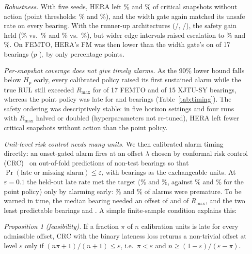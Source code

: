\documentclass[conference]{IEEEtran}
\newcommand{\Hp}{H_{\mathrm{p}}}
\begin{document}
\textit{Robustness.} With five seeds, HERA left \feRobFiveUnsafeHera\% and \xjRobFiveUnsafeHera\% of critical snapshots without action (point thresholds: \feRobFiveUnsafePoint\% and \xjRobFiveUnsafePoint\%), and the width gate again matched its unsafe rate on every bearing. With the runner-up architectures (\feRobAltEdge/\feRobAltCloud, \xjRobAltEdge/\xjRobAltCloud), the safety gain held (\feRobAltUnsafeHera\% vs.\ \feRobAltUnsafePoint\% and \xjRobAltUnsafeHera\% vs.\ \xjRobAltUnsafePoint\%), but wider edge intervals raised escalation to \feRobAltEscHera\% and \xjRobAltEscHera\%. On FEMTO, HERA's FM was then lower than the width gate's on \feRobAltNzFmWidth{} of 17 bearings ($p$ \feRobAltPFmWidth), by only \feRobAltFmWidthDiff{} percentage points.



\textit{Per-snapshot coverage does not give timely alarms.} As the 90\% lower bound falls below $\Hp$ early, every calibrated policy raised its first sustained alarm while the true RUL still exceeded $R_{\max}$ for \fePremHera{} of 17 FEMTO and \xjPremHera{} of 15 XJTU-SY bearings, whereas the point policy was late for \feLatePoint{} and \xjLatePoint{} bearings (Table~\ref{tab:timing}). The safety ordering was descriptively stable: in five horizon settings and four runs with $R_{\max}$ halved or doubled (hyperparameters not re-tuned), HERA left fewer critical snapshots without action than the point policy.

\textit{Unit-level risk control needs many units.} We then calibrated alarm timing directly: an onset-gated alarm fires at an offset $\lambda$ chosen by conformal risk control (CRC)~\cite{angelopoulos2024crc} on out-of-fold predictions of non-test bearings so that $\Pr(\text{late or missing alarm})\le\varepsilon$, with bearings as the exchangeable units. At $\varepsilon{=}0.1$ the held-out late rate met the target (\feLateCrcTen\% and \xjLateCrcTen\%, against \feLatePointHp\% and \xjLatePointHp\% for the point policy) only by alarming early: \fePremCrcTen\% and \xjPremCrcTen\% of alarms were premature. To be warned in time, the median bearing needed an offset of \feReqOffMed{} and \xjReqOffMed{} of $R_{\max}$, and the two least predictable bearings \feReqOffTop{} and \xjReqOffTop. A simple finite-sample condition explains this:

\textit{Proposition 1 (feasibility).} If a fraction $\pi$ of $n$ calibration units is late for every admissible offset, CRC with the binary lateness loss returns a non-trivial offset at level $\varepsilon$ only if $(n\pi+1)/(n+1)\le\varepsilon$, i.e.\ $\pi<\varepsilon$ and $n\ge(1-\varepsilon)/(\varepsilon-\pi)$.
\end{document}
